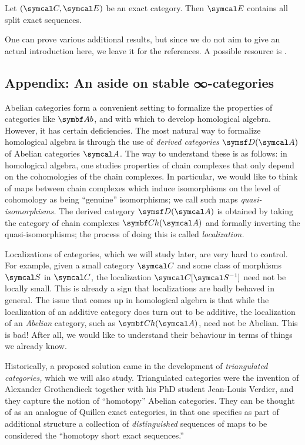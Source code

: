 \begin{corollary}
	Let \((\calC,\calE)\) be an exact category. Then \(\calE\) contains all split exact sequences.
\end{corollary}

One can prove various additional results, but since we do not aim to give an actual introduction here, we leave it for the references. A possible resource is \cite{frerick2010exact}.



\subsection{Appendix: An aside on stable ∞-categories}
Abelian categories form a convenient setting to formalize the properties of categories like \(\Ab\), and with which to develop homological algebra. However,
it has certain deficiencies. The most natural way to formalize homological algebra is through the use of \emph{derived categories} \(\sfD(\calA)\) of Abelian
categories \(\calA\). The way to understand these is as follows: in homological algebra, one studies properties of chain complexes that only depend on the cohomologies
of the chain complexes. In particular, we would like to think of maps between chain complexes which induce isomorphisms on the level of cohomology as being
``genuine'' isomorphisms; we call such maps \emph{quasi-isomorphisms.} The derived category \(\sfD(\calA)\) is obtained by taking the category of chain
complexes \(\Ch(\calA)\) and formally inverting the quasi-isomorphisms; the process of doing this is called \emph{localization.}

Localizations of categories, which we will study later, are very hard to control. For example, given a small category \(\calC\) and some class of morphisms \(\calS\) in \(\calC\),
the localization \(\calC[\calS^{-1}]\) need not be locally small. This is already a sign that localizations are badly behaved in general. The issue that comes up in homological algebra
is that while the localization of an additive category does turn out to be additive, the localization of an \emph{Abelian} category, such as \(\Ch(\calA)\), need not be Abelian.
This is bad! After all, we would like to understand their behaviour in terms of things we already know.

Historically, a proposed solution came in the development of \emph{triangulated categories,} which we will also study. Triangulated categories were the invention of Alexander Grothendieck
together with his PhD student Jean-Louis Verdier, and they capture the notion of ``homotopy'' Abelian categories. They can be thought of as an analogue of Quillen exact categories, in that
one specifies as part of additional structure a collection of \emph{distinguished} sequences of maps to be considered the ``homotopy short exact sequences.''


